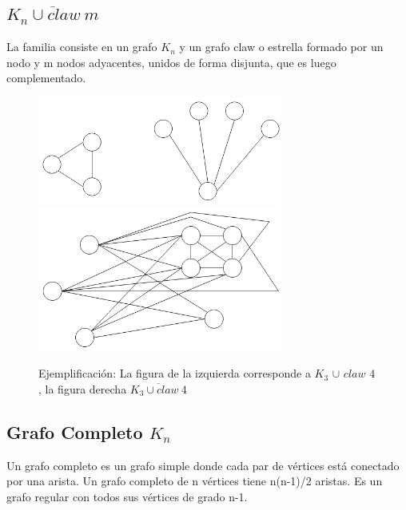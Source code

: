 \subsection{$\overline{K_n \cup claw \: m}$}
La familia consiste en un grafo $K_n$ y un grafo claw o estrella formado por un nodo y m nodos adyacentes, 
unidos de forma disjunta, que es luego complementado.
\begin{figure}[H]
\includegraphics[width=80mm]{K3UC4.png}
\includegraphics[width=80mm]{K3UC4Complemento.png}
\caption{Ejemplificación: La figura de la izquierda corresponde a $K_3$ $\cup$ $claw$ $4$, 
la figura derecha $\overline{K_3 \cup claw \: 4}$}
\label{overflow}
\end{figure}

\subsection{Grafo Completo $K_n$}
Un grafo completo es un grafo simple donde cada par de vértices está conectado por una arista.
Un grafo completo de n vértices tiene n(n-1)/2 aristas.
Es un grafo regular con todos sus vértices de grado n-1.

